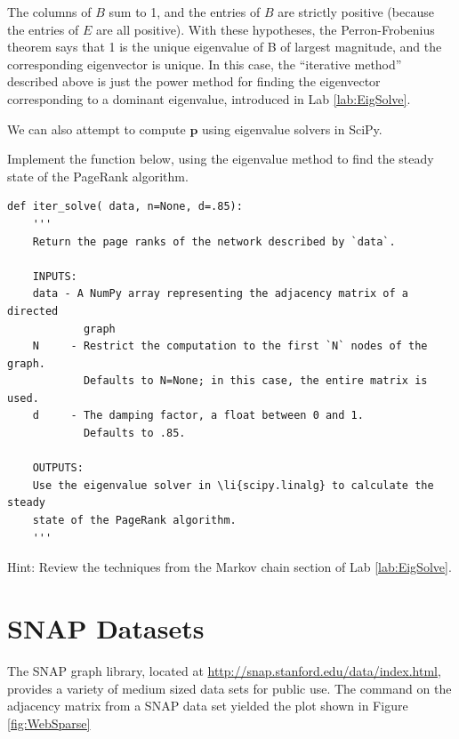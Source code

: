 The columns of $B$ sum to 1, and the entries of $B$ are strictly positive (because the entries of $E$ are all positive).
With these hypotheses, the Perron-Frobenius theorem says that 1 is the unique eigenvalue of B of largest magnitude, and the corresponding eigenvector is unique.
In this case, the ``iterative method'' described above is just the power method for finding the eigenvector corresponding to a dominant eigenvalue, introduced in Lab \ref{lab:EigSolve}.

We can also attempt to compute $\mathbf{p}$ using eigenvalue solvers in SciPy.

\begin{problem}
Implement the function below, using the eigenvalue method to find the steady state of the PageRank algorithm.
\begin{lstlisting}
def iter_solve( data, n=None, d=.85):
    '''
    Return the page ranks of the network described by `data`.
    
    INPUTS:
    data - A NumPy array representing the adjacency matrix of a directed 
            graph
    N     - Restrict the computation to the first `N` nodes of the graph. 
            Defaults to N=None; in this case, the entire matrix is used.
    d     - The damping factor, a float between 0 and 1. 
            Defaults to .85.
    
    OUTPUTS:
    Use the eigenvalue solver in \li{scipy.linalg} to calculate the steady 
    state of the PageRank algorithm.
    '''
\end{lstlisting}
Hint: Review the techniques from the Markov chain section of Lab \ref{lab:EigSolve}.
\end{problem}


\section*{SNAP Datasets}
The SNAP graph library, located at \url{http://snap.stanford.edu/data/index.html}, provides a variety of medium sized data sets for public use.
The  command on the adjacency matrix from a SNAP data set yielded the plot shown in Figure \ref{fig:WebSparse}

